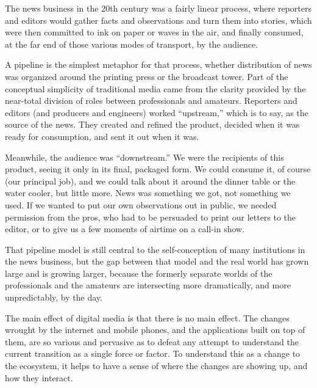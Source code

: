 The news business in the 20th century was a fairly linear process, where reporters
and editors would gather facts and observations and turn them into stories,
which were then committed to ink on paper or waves in the air, and finally
consumed, at the far end of those various modes of transport, by the audience.

A pipeline is the simplest metaphor for that process, whether distribution of
news was organized around the printing press or the broadcast tower. Part of the
conceptual simplicity of traditional media came from the clarity provided by the
near-total division of roles between professionals and amateurs. Reporters and
editors (and producers and engineers) worked ``upstream,'' which is to say, as the
source of the news. They created and refined the product, decided when it was
ready for consumption, and sent it out when it was.

Meanwhile, the audience was ``downstream.'' We were the recipients of this product,
seeing it only in its final, packaged form. We could consume it, of course (our
principal job), and we could talk about it around the dinner table or the water
cooler, but little more. News was something we got, not something we used. If
we wanted to put our own observations out in public, we needed permission
from the pros, who had to be persuaded to print our letters to the editor, or to
give us a few moments of airtime on a call-in show.

That pipeline model is still central to the self-conception of many institutions in
the news business, but the gap between that model and the real world has grown
large and is growing larger, because the formerly separate worlds of the professionals
and the amateurs are intersecting more dramatically, and more unpredictably,
by the day.

The main effect of digital media is that there is no main effect. The changes
wrought by the internet and mobile phones, and the applications built on top
of them, are so various and pervasive as to defeat any attempt to understand the
current transition as a single force or factor. To understand this as a change to
the ecosystem, it helps to have a sense of where the changes are showing up, and
how they interact.


